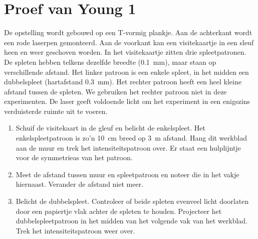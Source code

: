 \documentclass[../../main.tex]{subfiles}
\begin{document}
\onlyinsubfile{
\setcounter{chapter}{0}
}
\notinsubfile{}
\section{Proef van Young 1}\label{sec:wbYoung1}

De opstelling wordt gebouwd op een T-vormig plankje. Aan de achterkant wordt een rode laserpen gemonteerd. Aan de voorkant kan een visitekaartje in een sleuf heen en weer geschoven worden. In het visitekaartje zitten drie spleetpatronen. De spleten hebben telkens dezelfde breedte (\SI{0.1}{\milli\meter}), maar staan op verschillende afstand. Het linker patroon is een enkele spleet, in het midden een dubbelspleet (hartafstand \SI{0.3}{\milli\meter}). Het rechter patroon heeft een heel kleine afstand tussen de spleten. We gebruiken het rechter patroon niet in deze experimenten. De laser geeft voldoende licht om het experiment in een enigszins verduisterde ruimte uit te voeren.
\begin{enumerate}
\item Schuif de visitekaart in de gleuf en belicht de enkelspleet. Het enkelspleetpatroon is zo'n \SI{10}{\centi\meter} breed op \SI{3}{\meter} afstand. Hang dit werkblad aan de muur en trek het intensiteitspatroon over. Er staat een hulplijntje voor de symmetrieas van het patroon.
\item Meet de afstand tussen muur en spleetpatroon en noteer die in het vakje hiernaast. Verander de afstand niet meer.
\item Belicht de dubbelspleet. Controleer of beide spleten evenveel licht doorlaten door een papiertje vlak achter de spleten te houden. Projecteer het dubbelspleetpatroon in het midden van het volgende vak van het werkblad. Trek het intensiteitspatroon weer over.
\end{enumerate}
\end{document}
